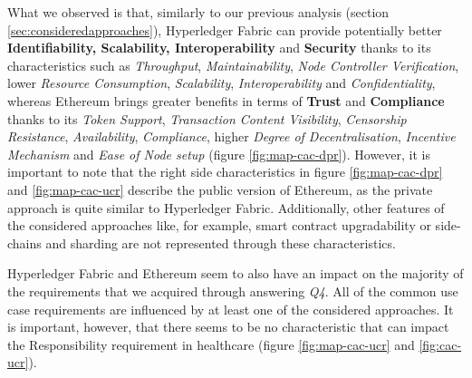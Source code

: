 What we observed is that, similarly to our previous analysis (section \ref{sec:consideredapproaches}), Hyperledger Fabric can provide potentially better \textbf{Identifiability, Scalability, Interoperability} and \textbf{Security} thanks to its characteristics such as \textit{Throughput}, \textit{Maintainability}, \textit{Node Controller Verification}, lower \textit{Resource Consumption}, \textit{Scalability}, \textit{Interoperability} and \textit{Confidentiality}, whereas Ethereum brings greater benefits in terms of \textbf{Trust} and \textbf{Compliance} thanks to its \textit{Token Support}, \textit{Transaction Content Visibility}, \textit{Censorship Resistance}, \textit{Availability}, \textit{Compliance}, higher \textit{Degree of Decentralisation}, \textit{Incentive Mechanism} and \textit{Ease of Node setup} (figure \ref{fig:map-cac-dpr}). However, it is important to note that the right side characteristics in figure \ref{fig:map-cac-dpr} and \ref{fig:map-cac-ucr} describe the public version of Ethereum, as the private approach is quite similar to Hyperledger Fabric. Additionally, other features of the considered approaches like, for example, smart contract upgradability or side-chains and sharding are not represented through these characteristics.

Hyperledger Fabric and Ethereum seem to also have an impact on the majority of the requirements that we acquired through answering \textit{Q4}. All of the common use case requirements are influenced by at least one of the considered approaches. It is important, however, that there seems to be no characteristic that can impact the Responsibility requirement in healthcare (figure \ref{fig:map-cac-ucr} and \ref{fig:cac-ucr}).


